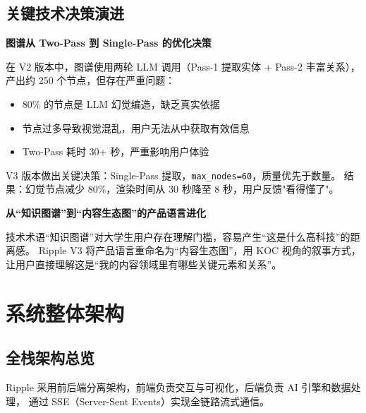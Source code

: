 \documentclass[12pt,a4paper]{ctexart}
\begin{document}
\subsection{关键技术决策演进}

\textbf{图谱从 Two-Pass 到 Single-Pass 的优化决策}

在 V2 版本中，图谱使用两轮 LLM 调用（Pass-1 提取实体 + Pass-2 丰富关系），
产出约 250 个节点，但存在严重问题：
\begin{itemize}
  \item 80\% 的节点是 LLM 幻觉编造，缺乏真实依据
  \item 节点过多导致视觉混乱，用户无法从中获取有效信息
  \item Two-Pass 耗时 30+ 秒，严重影响用户体验
\end{itemize}

V3 版本做出关键决策：Single-Pass 提取，\texttt{max\_nodes=60}，质量优先于数量。
结果：幻觉节点减少 80\%，渲染时间从 30 秒降至 8 秒，用户反馈"看得懂了"。

\textbf{从``知识图谱''到``内容生态图''的产品语言进化}

技术术语``知识图谱''对大学生用户存在理解门槛，容易产生``这是什么高科技''的距离感。
Ripple V3 将产品语言重命名为``内容生态图''，用 KOC 视角的叙事方式，
让用户直接理解这是``我的内容领域里有哪些关键元素和关系''。


\newpage
\begin{center}
\end{center}

\section{系统整体架构}

\subsection{全栈架构总览}

Ripple 采用前后端分离架构，前端负责交互与可视化，后端负责 AI 引擎和数据处理，
通过 SSE（Server-Sent Events）实现全链路流式通信。
\end{document}
